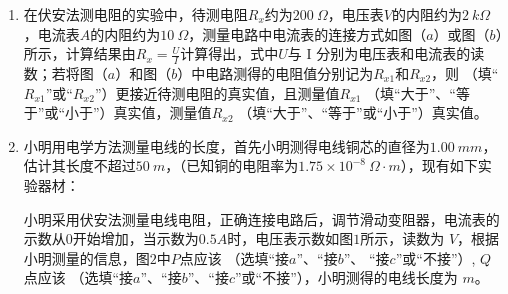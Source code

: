 
\begin{enumerate}[leftmargin=0em]
\renewcommand{\labelenumi}{\arabic{enumi}.}
\item
{}
在伏安法测电阻的实验中，待测电阻$ R_x $约为$ 200 \ \Omega $，电压表$ V $的内阻约为$ 2 \ k\Omega $，电流表$ A $的内阻约为$ 10 \ \Omega $，测量电路中电流表的连接方式如图（$ a $）或图（$ b $）所示，计算结果由$R _ { x } = \frac { U } { I }$计算得出，式中$ U $与 I 分别为电压表和电流表的读数；若将图（$ a $）和图（$ b $）中电路测得的电阻值分别记为$ R _{x1} $和$ R _{x2} $，则  （填“$ R _{x1} $”或“$ R _{x2} $”）更接近待测电阻的真实值，且测量值$ R _{x1} $  （填“大于”、“等于”或“小于”）真实值，测量值$ R _{x2} $  （填“大于”、“等于”或“小于”）真实值。
\begin{figure}[h!]
\centering

\end{figure}


\item 
{}
小明用电学方法测量电线的长度，首先小明测得电线铜芯的直径为$ 1.00 \ mm $，估计其长度不超过$ 50 \ m $，（已知铜的电阻率为$ 1.75 \times 10^{-8}\ \Omega \cdot m $），现有如下实验器材：

小明采用伏安法测量电线电阻，正确连接电路后，调节滑动变阻器，电流表的示数从$ 0 $开始增加，当示数为$ 0.5A $时，电压表示数如图$ 1 $所示，读数为  $ V $，根据小明测量的信息，图$ 2 $中$ P $点应该  （选填“接$ a $”、“接$ b $”、 “接$ c $”或“不接”）, $ Q $点应该  （选填“接$ a $”、“接$ b $”、“接$ c $”或“不接”），小明测得的电线长度为  $ m $。
\begin{figure}[h!]
\centering

\end{figure}


\end{enumerate}
